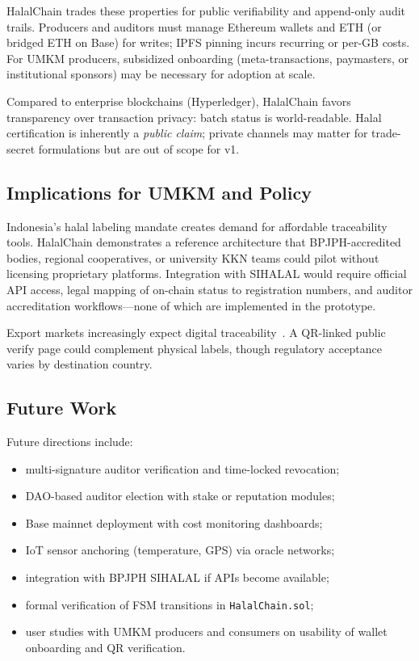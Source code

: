 HalalChain trades these properties for public verifiability and append-only audit trails.
Producers and auditors must manage Ethereum wallets and ETH (or bridged ETH on Base) for writes; IPFS pinning incurs recurring or per-GB costs.
For UMKM producers, subsidized onboarding (meta-transactions, paymasters, or institutional sponsors) may be necessary for adoption at scale.

Compared to enterprise blockchains (Hyperledger), HalalChain favors transparency over transaction privacy: batch status is world-readable.
Halal certification is inherently a \emph{public claim}; private channels may matter for trade-secret formulations but are out of scope for v1.

\subsection{Implications for UMKM and Policy}
Indonesia's halal labeling mandate creates demand for affordable traceability tools.
HalalChain demonstrates a reference architecture that BPJPH-accredited bodies, regional cooperatives, or university KKN teams could pilot without licensing proprietary platforms.
Integration with SIHALAL would require official API access, legal mapping of on-chain status to registration numbers, and auditor accreditation workflows---none of which are implemented in the prototype.

Export markets increasingly expect digital traceability~\cite{marianingsih2024halal}.
A QR-linked public verify page could complement physical labels, though regulatory acceptance varies by destination country.

\subsection{Future Work}
Future directions include:
\begin{itemize}
  \item multi-signature auditor verification and time-locked revocation;
  \item DAO-based auditor election with stake or reputation modules;
  \item Base mainnet deployment with cost monitoring dashboards;
  \item IoT sensor anchoring (temperature, GPS) via oracle networks;
  \item integration with BPJPH SIHALAL if APIs become available;
  \item formal verification of FSM transitions in \texttt{HalalChain.sol};
  \item user studies with UMKM producers and consumers on usability of wallet onboarding and QR verification.
\end{itemize}
